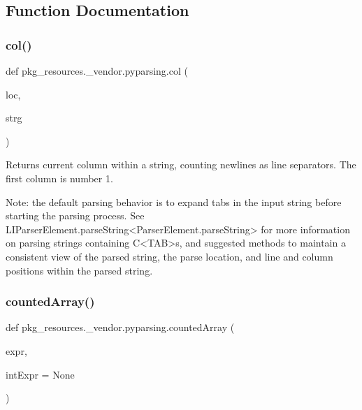 \subsection{Function Documentation}
\mbox{\label{namespacepkg__resources_1_1__vendor_1_1pyparsing_a1710a17eb90f9df71a49b342cc9140b9}} 
\subsubsection{\texorpdfstring{col()}{col()}}
{\footnotesize\ttfamily def pkg\+\_\+resources.\+\_\+vendor.\+pyparsing.\+col (\begin{DoxyParamCaption}\item[{}]{loc,  }\item[{}]{strg }\end{DoxyParamCaption})}

\begin{DoxyVerb}Returns current column within a string, counting newlines as line separators.
   The first column is number 1.

   Note: the default parsing behavior is to expand tabs in the input string
   before starting the parsing process.  See L{I{ParserElement.parseString}<ParserElement.parseString>} for more information
   on parsing strings containing C{<TAB>}s, and suggested methods to maintain a
   consistent view of the parsed string, the parse location, and line and column
   positions within the parsed string.\end{DoxyVerb}
 \mbox{\label{namespacepkg__resources_1_1__vendor_1_1pyparsing_aedaae993defd888864f4b23fe0112c99}} 
\subsubsection{\texorpdfstring{counted\+Array()}{countedArray()}}
{\footnotesize\ttfamily def pkg\+\_\+resources.\+\_\+vendor.\+pyparsing.\+counted\+Array (\begin{DoxyParamCaption}\item[{}]{expr,  }\item[{}]{int\+Expr = {\ttfamily None} }\end{DoxyParamCaption})}

